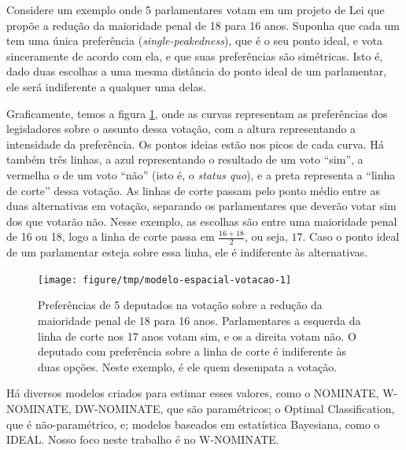 \documentclass[a4paper,titlepage]{ppgi}\usepackage[]{graphicx}\usepackage[]{color}
\newenvironment{knitrout}{}{} %
\begin{document}
Considere um exemplo onde 5 parlamentares votam em um
projeto de Lei que propõe a redução da maioridade penal de
18 para 16 anos. Suponha
que cada um tem uma única preferência (\emph{single-peakedness}), que é o seu
ponto ideal, e vota sinceramente de acordo com ela, e que suas preferências são
simétricas. Isto é, dado duas escolhas a uma mesma distância do ponto ideal de
um parlamentar, ele será indiferente a qualquer uma delas.

Graficamente, temos a figura \ref{fig:modelo-espacial-votacao}, onde as curvas
representam as preferências dos legisladores sobre o assunto dessa votação, com
a altura representando a intensidade da preferência. Os pontos ideias estão nos
picos de cada curva. Há também três linhas, a azul representando o resultado de
um voto ``sim'', a vermelha o de um voto ``não'' (isto é, o \emph{status quo}),
e a preta representa a ``linha de corte'' dessa votação. As linhas de corte
passam pelo ponto médio entre as duas alternativas em votação, separando os
parlamentares que deverão votar sim dos que votarão não. Nesse exemplo, as
escolhas são entre uma maioridade penal de 16 ou
18, logo a linha de corte passa em $\frac{16 +
18}{2}$, ou seja, $17$. Caso o ponto ideal de um parlamentar esteja sobre essa
linha, ele é indiferente às alternativas.

\begin{knitrout}
\color{fgcolor}\begin{figure}
\texttt{[image: figure/tmp/modelo-espacial-votacao-1]} \caption[Preferências de 5 deputados na votação sobre a redução da maioridade penal de 18 para 16 anos]{Preferências de 5 deputados na votação sobre a redução da maioridade penal de 18 para 16 anos.  Parlamentares a esquerda da linha de corte nos 17 anos votam sim, e os a direita votam não. O deputado com preferência sobre a linha de corte é indiferente às duas opções. Neste exemplo, é ele quem desempata a votação.}\label{fig:modelo-espacial-votacao}
\end{figure}


\end{knitrout}

Há diversos modelos criados para estimar esses valores, como o NOMINATE,
W-NOMINATE, DW-NOMINATE, que são paramétricos; o Optimal Classification, que é
não-paramétrico, e; modelos baseados em estatística Bayesiana, como o IDEAL.
Nosso foco neste trabalho é no W-NOMINATE.
\cite{Poole1985,Poole2000,Poole2005,Jackman2000,Clinton2004}
\end{document}
